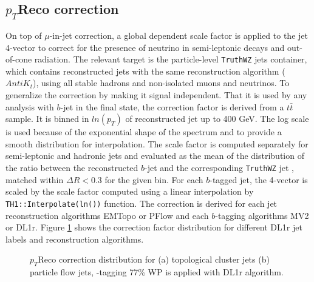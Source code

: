 \subsection{$p_T$Reco correction}
\label{Jet:Cal:BCal:pTReco}
On top of $\mu$-in-jet correction, a global \pT dependent scale factor is applied to the jet 4-vector to correct for the presence of neutrino in semi-leptonic decays and out-of-cone radiation. The relevant target is the particle-level \texttt{TruthWZ} jets container, which contains reconstructed jets with the same reconstruction algorithm ($AntiK_t$), using all stable hadrons and non-isolated muons and neutrinos. To generalize the correction by making it signal independent. That it is used by any analysis with $b$-jet in the final state, the correction factor is derived from a $t\bar{t}$ sample. It is binned in $ln(p_T)$ of reconstructed jet up to 400 GeV. The log scale is used because of the exponential shape of the \pT spectrum and to provide a smooth distribution for interpolation. The scale factor is computed separately for semi-leptonic and hadronic jets and evaluated as the mean of the distribution of the ratio between the reconstructed $b$-jet \pT and the corresponding \texttt{TruthWZ} jet \pT, matched within $\Delta R < 0.3$ for the given \pT bin. For each $b$-tagged jet, the 4-vector is scaled by the scale factor computed using a linear interpolation by \texttt{TH1::Interpolate(ln(\pT))} function. The correction is derived for each jet reconstruction algorithms EMTopo or PFlow and each $b$-tagging algorithms MV2 or DL1r. Figure \ref{fig:Jet:Cal:BCal:pTReco} shows the correction factor distribution for different DL1r jet labels and reconstruction algorithms. 
\begin{figure}[htbp]
   \centering
   \quad
   \begin{tcolorbox}[colback=black!5!white,colframe=white!75!black]
   \caption{$p_T$Reco correction distribution for (a) topological cluster jets (b) particle flow jets, \bq-tagging 77\% WP is applied with DL1r algorithm.}
   \label{fig:Jet:Cal:BCal:pTReco}
   \end{tcolorbox}
   
\end{figure}
